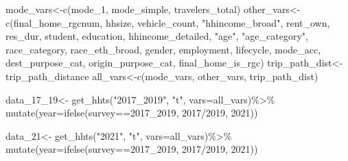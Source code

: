 \documentclass[
  12pt,
]{article}
\newenvironment{Shaded}{\begin{snugshade}}{\end{snugshade}}
\newcommand{\AttributeTok}[1]{\textcolor[rgb]{0.77,0.63,0.00}{#1}}
\newcommand{\FunctionTok}[1]{\textcolor[rgb]{0.00,0.00,0.00}{#1}}
\newcommand{\NormalTok}[1]{#1}
\newcommand{\OtherTok}[1]{\textcolor[rgb]{0.56,0.35,0.01}{#1}}
\newcommand{\SpecialCharTok}[1]{\textcolor[rgb]{0.00,0.00,0.00}{#1}}
\newcommand{\StringTok}[1]{\textcolor[rgb]{0.31,0.60,0.02}{#1}}
\begin{document}
\begin{Shaded}
\begin{Highlighting}[]
\NormalTok{mode\_vars}\OtherTok{\textless{}{-}}\FunctionTok{c}\NormalTok{(}\StringTok{\textquotesingle{}mode\_1\textquotesingle{}}\NormalTok{, }\StringTok{\textquotesingle{}mode\_simple\textquotesingle{}}\NormalTok{, }\StringTok{\textquotesingle{}travelers\_total\textquotesingle{}}\NormalTok{)}
\NormalTok{other\_vars}\OtherTok{\textless{}{-}}\FunctionTok{c}\NormalTok{(}\StringTok{\textquotesingle{}final\_home\_rgcnum\textquotesingle{}}\NormalTok{, }\StringTok{\textquotesingle{}hhsize\textquotesingle{}}\NormalTok{, }\StringTok{\textquotesingle{}vehicle\_count\textquotesingle{}}\NormalTok{,  }\StringTok{"hhincome\_broad"}\NormalTok{, }\StringTok{\textquotesingle{}rent\_own\textquotesingle{}}\NormalTok{, }\StringTok{\textquotesingle{}res\_dur\textquotesingle{}}\NormalTok{, }\StringTok{\textquotesingle{}student\textquotesingle{}}\NormalTok{, }\StringTok{\textquotesingle{}education\textquotesingle{}}\NormalTok{,  }\StringTok{\textquotesingle{}hhincome\_detailed\textquotesingle{}}\NormalTok{, }\StringTok{"age"}\NormalTok{, }\StringTok{"age\_category"}\NormalTok{, }\StringTok{\textquotesingle{}race\_category\textquotesingle{}}\NormalTok{, }\StringTok{\textquotesingle{}race\_eth\_broad\textquotesingle{}}\NormalTok{, }\StringTok{\textquotesingle{}gender\textquotesingle{}}\NormalTok{, }\StringTok{\textquotesingle{}employment\textquotesingle{}}\NormalTok{,  }\StringTok{\textquotesingle{}lifecycle\textquotesingle{}}\NormalTok{, }\StringTok{\textquotesingle{}mode\_acc\textquotesingle{}}\NormalTok{, }\StringTok{\textquotesingle{}dest\_purpose\_cat\textquotesingle{}}\NormalTok{, }\StringTok{\textquotesingle{}origin\_purpose\_cat\textquotesingle{}}\NormalTok{, }\StringTok{\textquotesingle{}final\_home\_is\_rgc\textquotesingle{}}\NormalTok{)}
\NormalTok{trip\_path\_dist}\OtherTok{\textless{}{-}}\StringTok{\textquotesingle{}trip\_path\_distance\textquotesingle{}}
\NormalTok{all\_vars}\OtherTok{\textless{}{-}}\FunctionTok{c}\NormalTok{(mode\_vars, other\_vars, trip\_path\_dist)}

\NormalTok{data\_17\_19}\OtherTok{\textless{}{-}} \FunctionTok{get\_hhts}\NormalTok{(}\StringTok{"2017\_2019"}\NormalTok{, }\StringTok{"t"}\NormalTok{, }\AttributeTok{vars=}\NormalTok{all\_vars)}\SpecialCharTok{\%\textgreater{}\%} \FunctionTok{mutate}\NormalTok{(}\AttributeTok{year=}\FunctionTok{ifelse}\NormalTok{(survey}\SpecialCharTok{==}\StringTok{\textquotesingle{}2017\_2019\textquotesingle{}}\NormalTok{, }\StringTok{\textquotesingle{}2017/2019\textquotesingle{}}\NormalTok{, }\StringTok{\textquotesingle{}2021\textquotesingle{}}\NormalTok{))}

\NormalTok{data\_21}\OtherTok{\textless{}{-}} \FunctionTok{get\_hhts}\NormalTok{(}\StringTok{"2021"}\NormalTok{, }\StringTok{"t"}\NormalTok{, }\AttributeTok{vars=}\NormalTok{all\_vars)}\SpecialCharTok{\%\textgreater{}\%} \FunctionTok{mutate}\NormalTok{(}\AttributeTok{year=}\FunctionTok{ifelse}\NormalTok{(survey}\SpecialCharTok{==}\StringTok{\textquotesingle{}2017\_2019\textquotesingle{}}\NormalTok{, }\StringTok{\textquotesingle{}2017/2019\textquotesingle{}}\NormalTok{, }\StringTok{\textquotesingle{}2021\textquotesingle{}}\NormalTok{))}
\end{Highlighting}
\end{Shaded}
\end{document}
